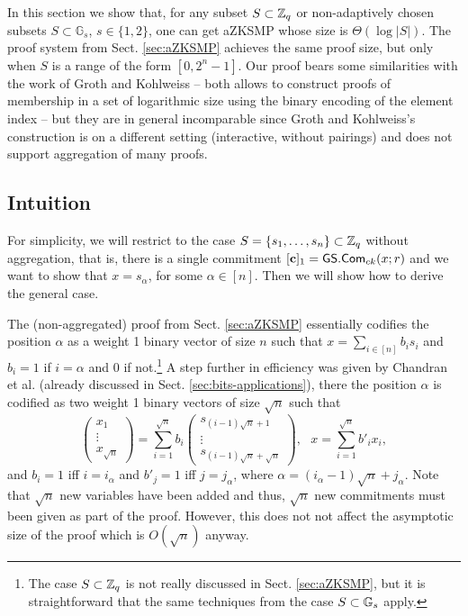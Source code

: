 In this section we show that, for any subset $S\subset\mathbb{Z}_q$ or non-adaptively chosen subsets $S\subset\mathbb{G}_s$, $s\in\{1,2\}$, one can get aZKSMP whose size is $\Theta(\log|S|)$. The proof system from Sect. \ref{sec:aZKSMP} achieves the same proof size, but only when $S$ is a range of the form $[0,2^n-1]$. Our proof bears some similarities with the work of Groth and Kohlweiss \cite{EC:GroKoh15} -- both allows to construct proofs of membership in a set of logarithmic size using the binary encoding of the element index -- but they are in general incomparable since Groth and Kohlweiss's construction is on a different setting (interactive, without pairings) and does not support aggregation of many proofs.

\subsection{Intuition}

For simplicity, we will restrict to the case $S=\{s_1,\ldots,s_n\}\subset\mathbb{Z}_q$ without aggregation, that is, there is a single commitment $[\mathbf{c}]_1={\mathsf{GS}}.\mathsf{Com}_{ck}(x;r)$ and we want to show that $x=s_\alpha$, for some $\alpha\in[n]$. Then we will show how to derive the general case.

The (non-aggregated) proof from Sect. \ref{sec:aZKSMP} essentially codifies the position $\alpha$ as a weight 1 binary vector of size $n$ such that $x=\sum_{i\in[n]}b_is_i$ and
$b_i=1$ if $i=\alpha$ and $0$ if not.\footnote{The case $S\subset\mathbb{Z}_q$ is not really discussed in Sect. \ref{sec:aZKSMP}, but it is straightforward that the same techniques from the case $S\subset\mathbb{G}_s$ apply.} A step further in efficiency was given by Chandran et al. \cite{ICALP:ChaGroSah07} (already discussed in Sect. \ref{sec:bits-applications}), there the position $\alpha$ is codified as two weight 1 binary vectors of size $\sqrt{n}$ such that
$$
\begin{pmatrix}
x_1\\\vdots\\x_{\sqrt{n}}
\end{pmatrix}
=\sum_{i=1}^{\sqrt{n}}b_i
\begin{pmatrix}
s_{(i-1)\sqrt{n}+1}\\\vdots\\s_{(i-1)\sqrt{n}+\sqrt{n}}
\end{pmatrix},
\text{ } x=\sum_{i=1}^{\sqrt{n}}b'_ix_i,$$
and $b_i=1$ iff $i=i_\alpha$ and $b'_j=1$ iff $j=j_\alpha$, where $\alpha=(i_\alpha-1)\sqrt{n}+j_\alpha$. Note that $\sqrt{n}$ new variables have been added and thus, $\sqrt{n}$ new commitments must been given as part of the proof. However, this does not not affect the asymptotic size of the proof which is $O(\sqrt{n})$ anyway.

